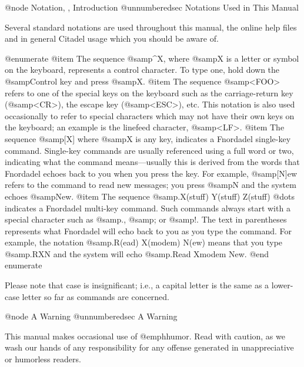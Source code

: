 @node Notation,  , Introduction
@unnumberedsec Notations Used in This Manual

Several standard notations are used throughout this manual, the online help
files and in general Citadel usage which you should be aware of.

@enumerate
@item
The sequence @samp{^X}, where @samp{X} is a letter or symbol on the keyboard,
represents a control character.  To type one, hold down the @samp{Control} key
and press @samp{X}.
@item
The sequence @samp{<FOO>} refers to one of the special keys on the keyboard
such as the carriage-return key (@samp{<CR>}), the escape key (@samp{<ESC>}),
etc.  This notation is also used occasionally to refer to special characters
which may not have their own keys on the keyboard; an example is the linefeed
character, @samp{<LF>}.
@item
The sequence @samp{[X]} where @samp{X} is any key, indicates a Fnordadel
single-key command.  Single-key commands are usually referenced using a full
word or two, indicating what the command means---usually this is derived from
the words that Fnordadel echoes back to you when you press the key.  For
example, @samp{[N]ew} refers to the command to read new messages; you
press @samp{N} and the system echoes @samp{New}.
@item
The sequence @samp{.X(stuff) Y(stuff) Z(stuff) @dots{}} indicates a Fnordadel
multi-key command.  Such commands always start with a special character such
as @samp{.}, @samp{;} or @samp{!}.  The text in parentheses represents what
Fnordadel will echo back to you as you type the command.  For example, the
notation @samp{.R(ead) X(modem) N(ew)} means that you type @samp{.RXN} and
the system will echo @samp{.Read Xmodem New}.
@end enumerate

Please note that case is insignificant; i.e., a capital letter is the same as a
lower-case letter so far as commands are concerned.

@node A Warning
@unnumberedsec A Warning

This manual makes occasional use of @emph{humor}.  Read with caution, as we
wash our hands of any responsibility for any offense generated in
unappreciative or humorless readers.
